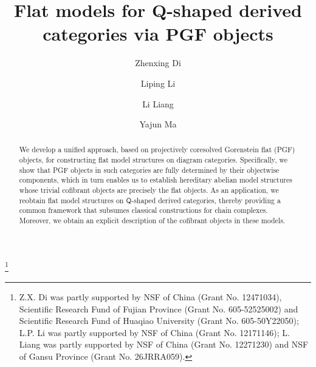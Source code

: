 \documentclass{amsart}
\theoremstyle{bfupright head,slanted body}
\theoremstyle{bfupright head,upright body}
\theoremstyle{fixed bf head,slanted body}
\theoremstyle{fixed bf head,upright body}
\theoremstyle{numbered paragraph}
\numberwithin{equation}{res}
\newcommand{\Q}{\mathsf{Q}}
\begin{document}
\title[Flat models for Q-shaped derived categories via PGF objects]%
{Flat models for Q-shaped derived categories via PGF objects}

\author[Z.X. Di]{Zhenxing Di}

\address{Zhenxing Di: School of Mathematical Sciences, Huaqiao University, Quanzhou 362021, China}


\author[L.P. Li]{Liping Li}

\address{Liping Li: Department of Mathematics, Hunan Normal University, Changsha 410081, China}


\author[L. Liang]{Li Liang}

\address{Li Liang: Department of Mathematics, Gansu Center for Fundamental Research in Complex Systems Analysis and Control, Lanzhou Jiaotong University, Lanzhou 730070, China}



\author[Y.J. Ma]{Yajun Ma}

\address{Yajun Ma: Department of Mathematics, Gansu Center for Fundamental Research in Complex Systems Analysis and Control, Lanzhou Jiaotong University, Lanzhou 730070, China}


\thanks{Z.X. Di was partly supported by NSF of China (Grant No. 12471034),
Scientific Research Fund of Fujian Province (Grant No. 605-52525002) and
Scientific Research Fund of Huaqiao University (Grant No. 605-50Y22050); L.P. Li was partly supported by NSF of China (Grant No. 12171146); L. Liang was partly supported by NSF of China (Grant No. 12271230) and NSF of Gansu Province (Grant No. 26JRRA059).}


\renewcommand{\thefootnote}{\alph{footnote}}

\begin{abstract}
We develop a unified approach, based on projectively coresolved Gorenstein flat (PGF) objects, for constructing flat model structures on diagram categories. Specifically, we show that PGF objects in such categories are fully determined by their objectwise components, which in turn enables us to establish hereditary abelian model structures whose trivial cofibrant objects are precisely the flat objects. As an application, we reobtain flat model structures on $\Q$-shaped derived categories, thereby providing a common framework that subsumes classical constructions for chain complexes. Moreover, we obtain an explicit description of the cofibrant objects in these models.
\end{abstract}
\end{document}
